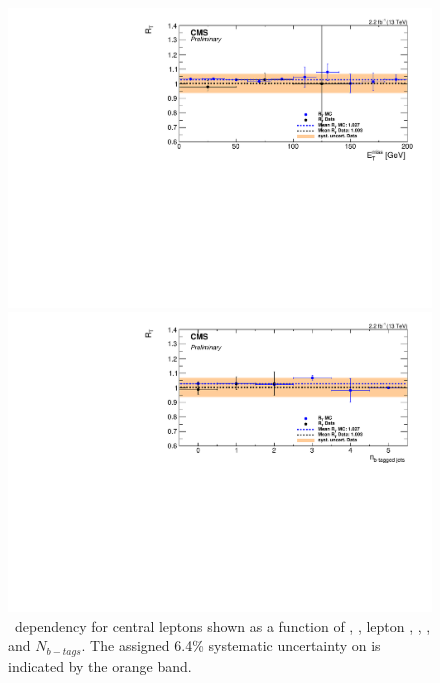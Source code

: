 \begin{figure}[htbp]
\begin{minipage}[t]{0.3\textwidth}
    \includegraphics[width=\textwidth]{bkgd/figs/Triggereff_SFvsOF_Syst_PFHT_HighHTExclusiveCentral_Run2015_25ns_MET_None_NonIso_MC.pdf}
  \end{minipage}
  \begin{minipage}[t]{0.3\textwidth}
    \includegraphics[width=\textwidth]{bkgd/figs/Triggereff_SFvsOF_Syst_PFHT_HighHTExclusiveCentral_Run2015_25ns_NBJets_None_NonIso_MC.pdf}
  \end{minipage}

  \caption{
    \rt\ dependency for central leptons shown as a function of \nj, \nvtx, lepton \pt, \mll, \MET, and $N_{b-tags}$.
    The assigned 6.4\% systematic uncertainty on \rt is indicated by the orange band.
  }
  \label{fig:EffDependencyBarrel}
\end{figure}

